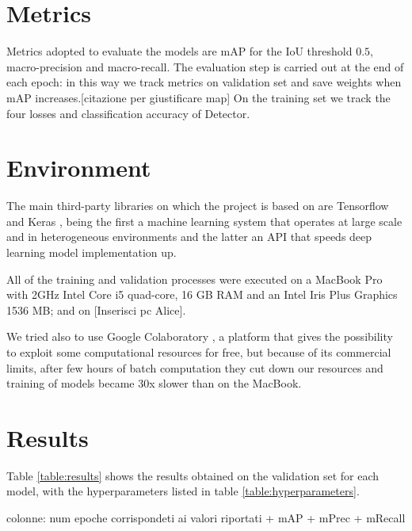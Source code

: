 \documentclass[a4paper,10pt]{report}
\begin{document}
\section{Metrics}
Metrics adopted to evaluate the models are mAP for the IoU threshold $0.5$, macro-precision and macro-recall.
The evaluation step is carried out at the end of each epoch: in this way we track metrics on validation set and save weights when mAP increases.[citazione per giustificare map]
On the training set we track the four losses and classification accuracy of Detector.

\section{Environment}
The main third-party libraries on which the project is based on are Tensorflow \cite{tensorflow} and Keras \cite{keras}, being the first a machine learning system that operates at large scale and in heterogeneous environments and the latter an API that speeds deep learning model implementation up.

All of the training and validation processes were executed on a MacBook Pro with 2GHz Intel Core i5 quad-core, 16 GB RAM and an Intel Iris Plus Graphics 1536 MB; and on [Inserisci pc Alice].

We tried also to use Google Colaboratory \cite{colab}, a platform that gives the possibility to exploit some computational resources for free, but because of its commercial limits, after few hours of batch computation they cut down our resources and training of models became 30x slower than on the MacBook.

\section{Results}\label{sec:results}
Table \ref{table:results} shows the results obtained on the validation set for each model, with the hyperparameters listed in table \ref{table:hyperparameters}.

colonne: num epoche corrispondeti ai valori riportati + mAP + mPrec + mRecall
\end{document}

